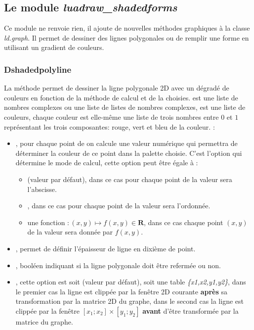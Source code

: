 \subsection{Le module \emph{luadraw\_shadedforms}}

Ce module ne renvoie rien, il ajoute de nouvelles méthodes graphiques à la classe \emph{ld.graph}. Il permet de dessiner des lignes polygonales ou de remplir une forme en utilisant un gradient de couleurs.

\subsubsection{Dshadedpolyline}

La méthode  permet de dessiner la ligne polygonale 2D  avec un dégradé de couleurs en fonction de la méthode de calcul et de la  choisies.  est une liste de nombres complexes ou une liste de listes de nombres complexes,  est une liste de couleurs, chaque couleur est elle-même une liste de trois nombres entre $0$ et $1$ représentant les trois composantes: rouge, vert et bleu de la couleur. \writeoptions :
\begin{itemize}
    \item {}, pour chaque point de  on calcule une valeur numérique qui permettra de déterminer la couleur de ce point dans la palette choisie. C'est l'option  qui détermine le mode de calcul, cette option peut être égale à : 
        \begin{itemize}
            \item {} (valeur par défaut), dans ce cas pour chaque point de  la valeur sera l'abscisse. 
            \item {}, dans ce cas pour chaque point de  la valeur sera l'ordonnée. 
            \item une fonction $\colon(x,y)\mapsto f(x,y)\in\mathbf R$, dans ce cas chaque point $(x,y)$ de  la valeur sera donnée par $f(x,y)$.
        \end{itemize}
    \item {}, permet de définir l'épaisseur de ligne en dixième de point.
    \item {}, booléen indiquant si la ligne polygonale doit être refermée ou non.
    \item {}, cette option est soit \nil (valeur par défaut), soit une table \emph{\{x1,x2,y1,y2\}}, dans le premier cas la ligne est clippée par la fenêtre 2D courante \textbf{après} sa transformation par la matrice 2D du graphe, dans le second cas la ligne est clippée par la fenêtre $[x_1;x_2]\times[y_1;y_2]$ \textbf{avant} d'être transformée par la matrice du graphe.
\end{itemize}

